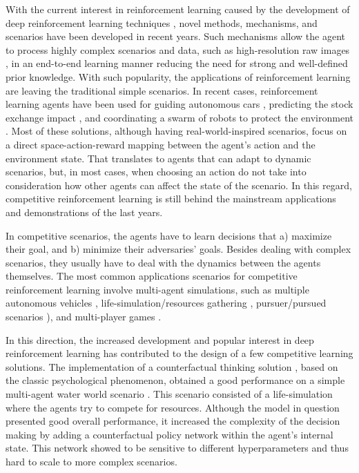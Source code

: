 \documentclass[a4paper,conference]{IEEEtran}
\begin{document}

With the current interest in reinforcement learning caused by the development of deep reinforcement learning techniques \cite{mnih2013playing}, novel methods, mechanisms, and scenarios have been developed in recent years. Such mechanisms allow the agent to process highly complex scenarios and data, such as high-resolution raw images \cite{lillicrap2015continuous}, in an end-to-end learning manner reducing the need for strong and well-defined prior knowledge. With such popularity, the applications of reinforcement learning are leaving the traditional simple scenarios. In recent cases, reinforcement learning agents have been used for guiding autonomous cars \cite{sallab2017deep, isele2018navigating}, predicting the stock exchange impact \cite{ponomarev2019using, meng2019reinforcement}, and coordinating a swarm of robots to protect the environment \cite{haksar2018distributed, yu2018reinforcement}. Most of these solutions, although having real-world-inspired scenarios, focus on a direct space-action-reward mapping between the agent's action and the environment state. That translates to agents that can adapt to dynamic scenarios, but, in most cases, when choosing an action do not take into consideration how other agents can affect the state of the scenario. In this regard, competitive reinforcement learning is still behind the mainstream applications and demonstrations of the last years.

In competitive scenarios, the agents have to learn decisions that a) maximize their goal, and b) minimize their adversaries' goals. Besides dealing with complex scenarios, they usually have to deal with the dynamics between the agents themselves. The most common applications scenarios for competitive reinforcement learning involve multi-agent simulations, such as multiple autonomous vehicles \cite{fridman2018deeptraffic}, life-simulation/resources gathering \cite{xu2018hierarchical}, pursuer/pursued scenarios \cite{wang2019competitive}), and multi-player games \cite{mckenzie2017competitive}. 

In this direction, the increased development and popular interest in deep reinforcement learning has contributed to the design of a few competitive learning solutions. The implementation of a counterfactual thinking solution \cite{wang2019competitive}, based on the classic psychological phenomenon, obtained a good performance on a simple multi-agent water world scenario \cite{gupta2017cooperative}. This scenario consisted of a life-simulation where the agents try to compete for resources. Although the model in question presented good overall performance, it increased the complexity of the decision making by adding a counterfactual policy network within the agent's internal state. This network showed to be sensitive to different hyperparameters and thus hard to scale to more complex scenarios.
\end{document}
